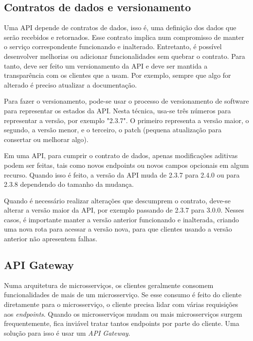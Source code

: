 

\subsection{Contratos de dados e versionamento}
Uma API depende de contratos de dados, isso é, uma definição dos dados que serão recebidos e retornados. Esse contrato implica num compromisso de manter o serviço correspondente funcionando e inalterado. Entretanto, é possível desenvolver melhorias ou adicionar funcionalidades sem quebrar o contrato. Para tanto, deve ser feito um versionamento da API e deve ser mantida a transparência com os clientes que a usam. Por exemplo, sempre que algo for alterado é preciso atualizar a documentação.

Para fazer o versionamento, pode-se usar o processo de versionamento de software para representar os estados da API. Nesta técnica, usa-se três números para representar a versão, por exemplo "2.3.7". O primeiro representa a versão maior, o segundo, a versão menor, e o terceiro, o patch (pequena atualização para consertar ou melhorar algo). \cite{wiki_software_versioning_2022}

Em uma API, para cumprir o contrato de dados, apenas modificações aditivas podem ser feitas, tais como novos endpoints ou novos campos opcionais em algum recurso. Quando isso é feito, a versão da API muda de 2.3.7 para 2.4.0 ou para 2.3.8 dependendo do tamanho da mudança.

Quando é necessário realizar alterações que descumprem o contrato, deve-se alterar a versão maior da API, por exemplo passando de 2.3.7 para 3.0.0. Nesses casos, é importante manter a versão anterior funcionando e inalterada, criando uma nova rota para acessar a versão nova, para que clientes usando a versão anterior não apresentem falhas.

\subsection{API Gateway}\label{boas-praticas-api-gateway}
Numa arquitetura de microsserviços, os clientes geralmente consomem funcionalidades de mais de um microsserviço. Se esse consumo é feito do cliente diretamente para o microsserviço, o cliente precisa lidar com várias requisições aos \emph{endpoints}. Quando os microsserviços mudam ou mais microsserviços surgem frequentemente, fica inviável tratar tantos endpoints por parte do cliente. Uma solução para isso é usar um \emph{API Gateway}. 

